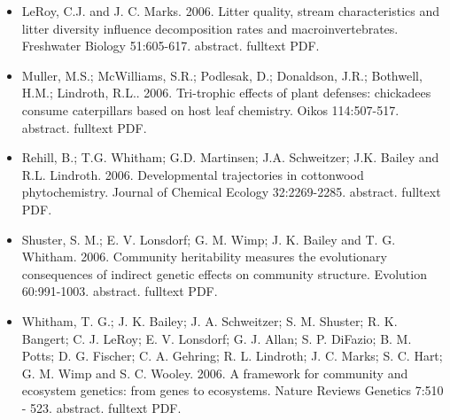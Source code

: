 \documentclass[12pt]{article}
\begin{document}
\begin{itemize}
\item LeRoy, C.J. and J. C. Marks. 2006. Litter quality, stream
characteristics and litter diversity influence decomposition rates and
macroinvertebrates. Freshwater Biology 51:605-617. abstract. fulltext
PDF.
 
\item Muller, M.S.; McWilliams, S.R.; Podlesak, D.; Donaldson, J.R.;
Bothwell, H.M.; Lindroth, R.L.. 2006. Tri-trophic effects of plant
defenses: chickadees consume caterpillars based on host leaf
chemistry. Oikos 114:507-517. abstract. fulltext PDF.
 
\item Rehill, B.; T.G. Whitham; G.D. Martinsen; J.A. Schweitzer; J.K. Bailey
and R.L. Lindroth. 2006. Developmental trajectories in cottonwood
phytochemistry. Journal of Chemical Ecology
32:2269-2285. abstract. fulltext PDF.
 
\item Shuster, S. M.; E. V. Lonsdorf; G. M. Wimp; J. K. Bailey and
T. G. Whitham. 2006. Community heritability measures the evolutionary
consequences of indirect genetic effects on community
structure. Evolution 60:991-1003. abstract. fulltext PDF.
 
\item Whitham, T. G.; J. K. Bailey; J. A. Schweitzer; S. M. Shuster;
R. K. Bangert; C. J. LeRoy; E. V. Lonsdorf; G. J. Allan;
S. P. DiFazio; B. M. Potts; D. G. Fischer; C. A. Gehring;
R. L. Lindroth; J. C. Marks; S. C. Hart; G. M. Wimp and
S. C. Wooley. 2006. A framework for community and ecosystem genetics:
from genes to ecosystems. Nature Reviews Genetics 7:510 -
523. abstract. fulltext PDF.
 
\end{itemize}
\end{document}
